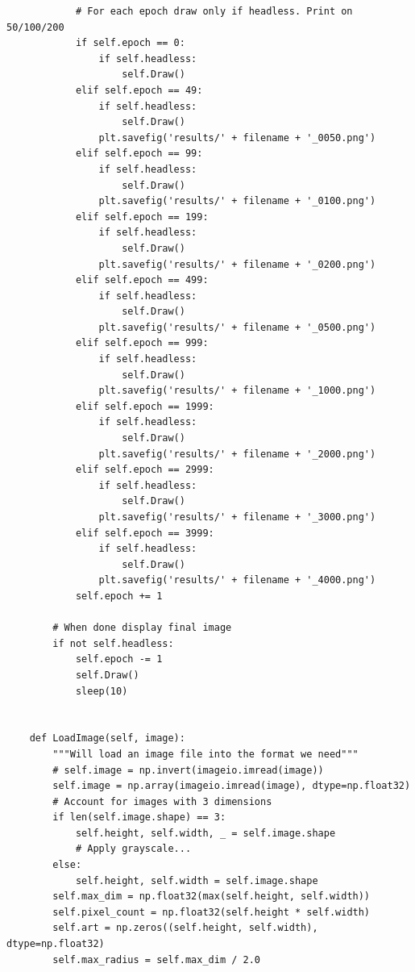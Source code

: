 \documentclass[12pt]{article}
\begin{document}
\begin{verbatim}
            # For each epoch draw only if headless. Print on 50/100/200
            if self.epoch == 0:
                if self.headless:
                    self.Draw()
            elif self.epoch == 49:
                if self.headless:
                    self.Draw()
                plt.savefig('results/' + filename + '_0050.png')
            elif self.epoch == 99:
                if self.headless:
                    self.Draw()
                plt.savefig('results/' + filename + '_0100.png')
            elif self.epoch == 199:
                if self.headless:
                    self.Draw()
                plt.savefig('results/' + filename + '_0200.png')
            elif self.epoch == 499:
                if self.headless:
                    self.Draw()
                plt.savefig('results/' + filename + '_0500.png')
            elif self.epoch == 999:
                if self.headless:
                    self.Draw()
                plt.savefig('results/' + filename + '_1000.png')
            elif self.epoch == 1999:
                if self.headless:
                    self.Draw()
                plt.savefig('results/' + filename + '_2000.png')
            elif self.epoch == 2999:
                if self.headless:
                    self.Draw()
                plt.savefig('results/' + filename + '_3000.png')
            elif self.epoch == 3999:
                if self.headless:
                    self.Draw()
                plt.savefig('results/' + filename + '_4000.png')
            self.epoch += 1

        # When done display final image
        if not self.headless:
            self.epoch -= 1
            self.Draw()
            sleep(10)


    def LoadImage(self, image):
        """Will load an image file into the format we need"""
        # self.image = np.invert(imageio.imread(image))
        self.image = np.array(imageio.imread(image), dtype=np.float32)
        # Account for images with 3 dimensions
        if len(self.image.shape) == 3:
            self.height, self.width, _ = self.image.shape
            # Apply grayscale...
        else:
            self.height, self.width = self.image.shape
        self.max_dim = np.float32(max(self.height, self.width))
        self.pixel_count = np.float32(self.height * self.width)
        self.art = np.zeros((self.height, self.width), dtype=np.float32)
        self.max_radius = self.max_dim / 2.0


\end{verbatim}
\end{document}
